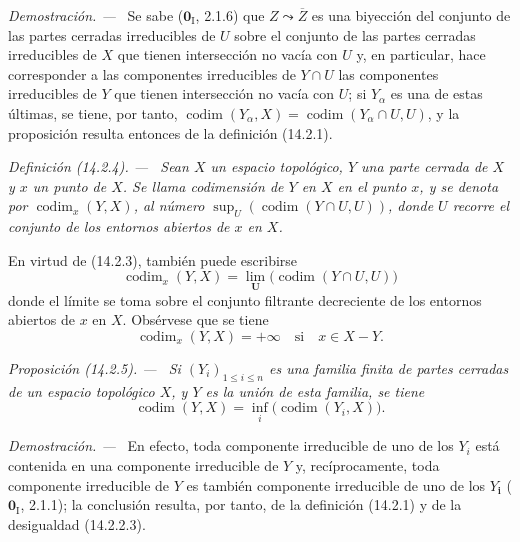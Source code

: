 \documentclass[10pt,oneside]{book}
\makeatletter
\newcommand{\setmanualcurrentlabel}[1]{\def\@currentlabel{#1}}
\newcommand{\oldpage}[2][]{%
  \setcounter{footnote}{0}%
  \marginpar{\scriptsize\textbf{#1}~|~#2}\ignorespaces}
\newenvironment{definition}[1][]{%
  \setmanualcurrentlabel{#1}\par\medskip\noindent\itshape Definición (#1). ---\ }{\par}
\newenvironment{proposition}[1][]{%
  \setmanualcurrentlabel{#1}\par\medskip\noindent\itshape Proposición (#1). ---\ }{\par}
\newenvironment{proof}{%
  \par\medskip\noindent\textit{Demostración. ---\ }}{\par}
\providecommand{\setmin}{-}%
\makeatother
\begin{document}
\begin{proof}
Se sabe ($\mathbf 0_{\mathrm I}$, 2.1.6) que $Z\leadsto\overline Z$ es una biyección
del conjunto de las partes cerradas irreducibles de $U$ sobre el conjunto de
las partes cerradas irreducibles de $X$ que tienen intersección no vacía con
$U$ y, en particular, hace corresponder a las componentes irreducibles de
$Y\cap U$ las componentes irreducibles de $Y$ que tienen intersección no vacía
con $U$; si $Y_\alpha$ es una de estas últimas,
se tiene, por tanto,
$\operatorname{codim}(Y_\alpha,X)=
\operatorname{codim}(Y_\alpha\cap U,U)$, y la proposición resulta entonces de
la definición (14.2.1).
\end{proof}

\begin{definition}[14.2.4]
\label{0.14.2.4-es}
Sean $X$ un espacio topológico, $Y$ una parte cerrada de $X$ y $x$ un punto de
$X$. Se llama codimensión de $Y$ en $X$ en el punto $x$, y se denota
por $\operatorname{codim}_x(Y,X)$, al número
$\sup_U(\operatorname{codim}(Y\cap U,U))$, donde $U$ recorre el conjunto de
los entornos abiertos de $x$ en $X$.
\end{definition}

En virtud de (14.2.3), también puede escribirse
\[
  \operatorname{codim}_x(Y,X)=
  \lim_{\mathbf U}\bigl(\operatorname{codim}(Y\cap U,U)\bigr)
  \tag{14.2.4.1}\label{0.14.2.4.1-es}
\]
donde el límite se toma sobre el conjunto filtrante decreciente de los
entornos abiertos de $x$ en $X$. Obsérvese que se tiene
\[
  \operatorname{codim}_x(Y,X)=+\infty\quad\text{si}\quad x\in X\setmin Y.
\]

\oldpage[0\textsubscript{IV-1}]{10}
\begin{proposition}[14.2.5]
\label{0.14.2.5-es}
Si $(Y_i)_{1\leq i\leq n}$ es una familia finita de partes cerradas de un
espacio topológico $X$, y $Y$ es la unión de esta familia, se tiene
\[
  \operatorname{codim}(Y,X)=
  \inf_i\bigl(\operatorname{codim}(Y_i,X)\bigr).
  \tag{14.2.5.1}\label{0.14.2.5.1-es}
\]
\end{proposition}

\begin{proof}
En efecto, toda componente irreducible de uno de los $Y_i$ está contenida en
una componente irreducible de $Y$ y, recíprocamente, toda componente
irreducible de $Y$ es también componente irreducible de uno de los $Y_{\boldsymbol i}$
($\mathbf{0}_{\mathrm I}$, 2.1.1); la conclusión resulta, por tanto, de la definición
(14.2.1) y de la desigualdad (14.2.2.3).
\end{proof}
\end{document}
